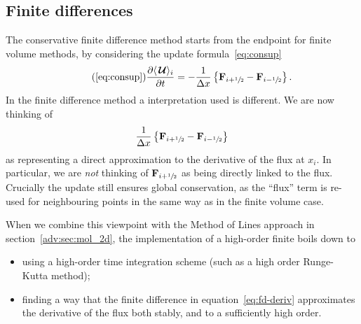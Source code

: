 %
%

  \subsection{Finite differences}

The conservative finite difference method starts from the endpoint for finite
volume methods, by considering the update formula~\eqref{eq:consup}
\begin{equation}
\tag{\ref{eq:consup}}
\frac{\partial \langle \Uc\rangle_{i}}{\partial t} =
  - \frac{1}{\Delta x} \left \{ \Fb_{i+\myhalf} -
                                \Fb_{i-\myhalf} \right \}.
\end{equation}
In the finite difference method a interpretation used is different. We are now
thinking of
\begin{equation}
  \label{eq:fd-deriv}
  \frac{1}{\Delta x} \left \{ {\bf F}_{i+{\sfrac{1}{2}}} -
                                {\bf F}_{i-{\sfrac{1}{2}}} \right \}
\end{equation}
as representing a direct approximation to the derivative of the flux at $x_i$.
In particular, we are \emph{not} thinking of ${\bf F}_{i+{\sfrac{1}{2}}}$ as being
directly linked to the flux. Crucially the update still ensures global
conservation, as the ``flux'' term is re-used for neighbouring points in the
same way as in the finite volume case.

When we combine this viewpoint with the Method of Lines approach in
section~\ref{adv:sec:mol_2d}, the implementation of a high-order finite boils
down to
\begin{itemize}
  \item using a high-order time integration scheme (such as a high order
  Runge-Kutta method);
  \item finding a way that the finite difference in equation~\eqref{eq:fd-deriv}
  approximates the derivative of the flux both stably, and to a sufficiently
  high order.
\end{itemize}

